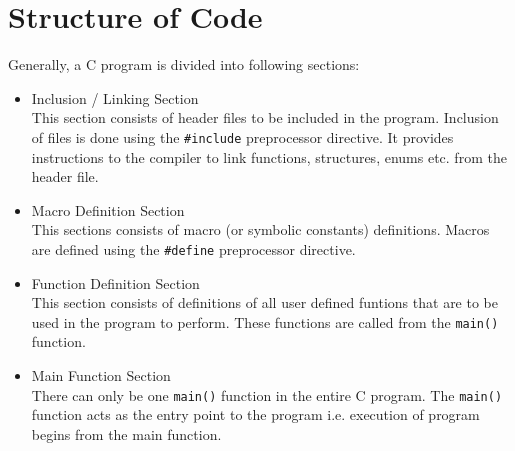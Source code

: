 \documentclass[report]{subfiles}
\begin{document}
    \section{Structure of Code}
    Generally, a C program is divided into following sections:
    \begin{itemize}
        \item{Inclusion / Linking Section}\\
            This section consists of header files to be included in the program. Inclusion of files is done using the \texttt{\#include} preprocessor directive. It provides instructions to the compiler to link functions, structures, enums etc. from the header file.
        \item{Macro Definition Section}\\
            This sections consists of macro (or symbolic constants) definitions. Macros are defined using the \texttt{\#define} preprocessor directive. 
        \item{Function Definition Section}\\
            This section consists of definitions of all user defined funtions that are to be used in the program to perform. These functions are called from the \texttt{main()} function.
        \item{Main Function Section}\\
            There can only be one \texttt{main()} function in the entire C program. The \texttt{main()} function acts as the entry point to the program i.e. execution of program begins from the main function.
    \end{itemize}
\end{document}
